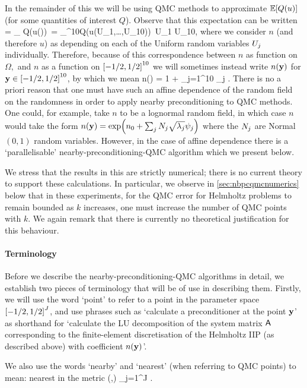 In the remainder of this  we will be using QMC methods to approximate $\EXP{Q(u)}$ (for some quantities of interest $Q$). Observe that this expectation can be written
\beqs
{} = \int_{\Omega} Q(u(\omega)) \,\ddPPomega = \int_{\mleft[-\half,\half\mright]^{10}}Q(u(U_1,\ldots,U_{10})) \,\dd U_1 \cdots \dd U_{10},
\eeqs
where we consider $n$ (and therefore $u$) as depending on each of the Uniform random variables $U_{j}$ individually. Therefore, because of this correspondence between $n$ as function on $\Omega,$ and $n$ as a function on $\mleft[-1/2,1/2\mright]^{10}$ we will sometimes instead write $n(\mathbf{y})$ for $\by \in \cube{10}$, by which we mean
\beqs
n(\by) = 1 + \sum_{j=1}^{10} \by_{j} \sqrt{\lambdaj} \psij.
\eeqs
There is no a priori reason that one must have such an affine dependence of the random field on the randomness in order to apply nearby preconditioning to QMC methods. One could, for example, take $n$ to be a lognormal random field, in which case $n$ would take the form $n(\by) = \exp\mleft(\nz + \sum_j \Nj \sqrt{\lambdaj} \psij\mright)$ where the $N_{j}$ are Normal$(0,1)$ random variables. However, in the case of affine dependence there is a `parallelisable' nearby-preconditioning-QMC algorithm which we present below.

We stress that the results in this  are strictly numerical; there is no current theory to support these calculations. In particular, we observe in \cref{sec:nbpcqmcnumerics} below that in these experiments, for the QMC error for Helmholtz problems to remain bounded as $k$ increases, one must increase the number of QMC points with $k.$ We again remark that there is currently no theoretical justification for this behaviour.


\paragraph{Terminology} Before we describe the nearby-preconditioning-QMC algorithms in detail, we establish two pieces of terminology that will be of use in describing them. Firstly, we will use the word `point' to refer to a point in the parameter space $\cube{J}$, and use phrases such as `calculate a preconditioner at the point $\mathbf{y}$' as shorthand for `calculate the LU decomposition of the system matrix $\mathsf{A}$ corresponding to the finite-element discretisation of the Helmholtz IIP (as described above) with coefficient $n(\mathbf{y})$'.

We also use the words `nearby' and `nearest' (when referring to QMC points) to mean: nearest in the metric
  \beq\label{eq:dapprox}
\dapprox(\byo,\byt) \de \sum_{j=1}^{J} \sqrt{\lambdaj} .%
\eeq

